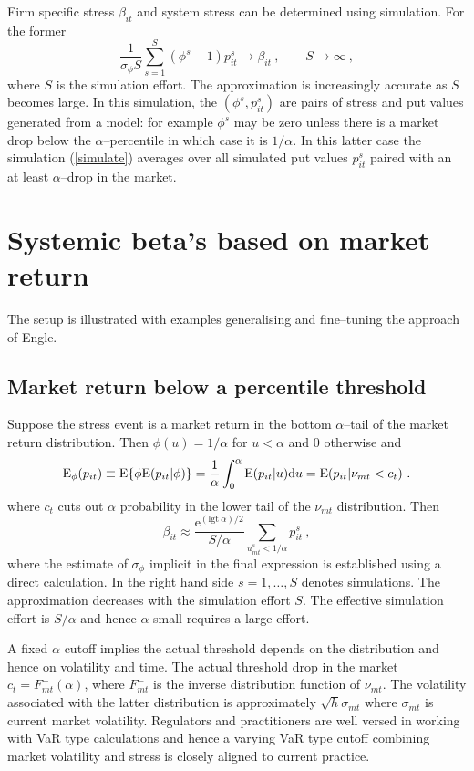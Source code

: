 \documentclass[authoryear]{elsarticle}
\newcommand{\logit}{\mathrm{lgt}}
\newcommand{\E}{\mathrm{E}}
\newcommand{\e}{\mathrm{e}}
\newcommand{\de}{\mathrm{d}}
\newcommand{\eref}[1]{(\ref{#1})}
\newcommand{\cq}{\ , \qquad}
\newcommand{\be}[1]{\begin{equation}\label{#1}}
\newcommand{\ee}{\end{equation}}
\begin{document}
Firm specific stress $\beta_{it}$ and system stress  can be determined using simulation.   For the former
\be{simulate}
\frac{1}{\sigma_\phi S}\sum_{s=1}^S (\phi^s-1)p_{it}^s\rightarrow \beta_{it} \cq S\rightarrow\infty\ ,
\ee
where $S$ is the simulation effort.  The approximation is increasingly accurate as $S$ becomes large.  In this simulation, the $(\phi^s,p_{it}^s)$ are pairs of stress and put values generated from a model: for example $\phi^s$ may be zero unless there is a market drop below the $\alpha$--percentile in which case it is $1/\alpha$.   In this latter case the simulation \eref{simulate} averages over all simulated put values $p_{it}^s$ paired with an at least $\alpha$--drop in the market.





\section{Systemic beta's based on  market return}
The setup is illustrated with  examples generalising and fine--tuning the approach of Engle.

\subsection{Market return below a percentile threshold} 

Suppose the stress event is a market return in the bottom $\alpha$--tail of the  market return distribution.   Then  $\phi(u)=1/\alpha$ for $u< \alpha$ and 0  otherwise and
$$
\Es(p_{it}) \equiv \E\{\phi\E(p_{it}|\phi)\} = \frac{1}{\alpha}\int_0^\alpha\E(p_{it}|u)\de u = \E(p_{it}|\nu_{mt}<c_{t}) \ .
$$
where $c_t$ cuts out $\alpha$ probability in the lower tail of the $\nu_{mt}$ distribution.   Then
$$
\beta_{it} \approx  \frac{\e^{(\logit\ \alpha)/2}}{S/\alpha} \sum_{u^s_{mt}<1/\alpha}  p_{it}^s\ ,
$$
where the estimate of $\sigma_\phi$ implicit in the final expression is established using a direct calculation.  In the right hand side $s=1,\ldots,S$ denotes simulations.  The approximation decreases with the simulation effort $S$.   The effective simulation effort is $S/\alpha$ and hence $\alpha$ small requires a  large effort.

A fixed $\alpha$ cutoff  implies the actual threshold depends on the distribution and hence  on volatility and  time.  The actual threshold drop in the market $c_t=F_{mt}^-(\alpha)$, where $F_{mt}^-$ is the inverse distribution function of $\nu_{mt}$.  The volatility associated with the latter distribution is approximately $\sqrt{h}\sigma_{mt}$ where $\sigma_{mt}$ is current market volatility.   Regulators and practitioners  are well versed in working with VaR type calculations and hence a varying VaR type cutoff combining market volatility and stress is closely aligned to current practice. 
\end{document}
